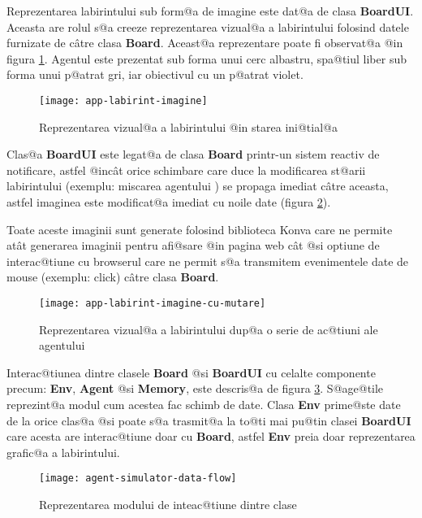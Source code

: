 Reprezentarea labirintului sub form@a de imagine este dat@a de clasa \textbf{BoardUI}. Aceasta are rolul s@a creeze reprezentarea vizual@a a labirintului folosind datele furnizate de c\^ atre clasa \textbf{Board}. Aceast@a reprezentare poate fi observat@a @in figura \ref{fig:labirint-imagine}. Agentul este prezentat sub forma unui cerc albastru, spa@tiul liber sub forma unui p@atrat gri, iar obiectivul cu un p@atrat violet.

\begin{figure}[h]
	\centering
	\texttt{[image: app-labirint-imagine]}
	\caption{Reprezentarea vizual@a a labirintului @in starea ini@tial@a}
	\label{fig:labirint-imagine}
\end{figure}

Clas@a \textbf{BoardUI} este legat@a de clasa \textbf{Board} printr-un sistem reactiv de notificare, astfel @inc\^ at orice schimbare care duce la modificarea st@arii labirintului (exemplu: miscarea agentului ) se propaga imediat c\^ atre aceasta, astfel imaginea este modificat@a imediat cu noile date (figura \ref{fig:labirint-imagine-cu-mutare}).

Toate aceste imaginii sunt generate folosind biblioteca Konva care ne permite at\^ at generarea imaginii pentru afi@sare @in pagina web c\^ at @si optiune de interac@tiune cu browserul care ne permit s@a transmitem evenimentele date de mouse (exemplu: click) c\^ atre clasa \textbf{Board}.

\begin{figure}[h]
	\centering
	\texttt{[image: app-labirint-imagine-cu-mutare]}
	\caption{Reprezentarea vizual@a a labirintului dup@a o serie de ac@tiuni ale agentului}
	\label{fig:labirint-imagine-cu-mutare}
\end{figure}

Interac@tiunea dintre clasele \textbf{Board} @si \textbf{BoardUI} cu celalte componente precum: \textbf{Env}, \textbf{Agent} @si \textbf{Memory}, este descris@a de figura \ref{fig:agent-simulator-data-flow}. S@age@tile reprezint@a modul cum acestea fac schimb de date. Clasa \textbf{Env} prime@ste date de la orice clas@a @si poate s@a trasmit@a la to@ti mai pu@tin clasei \textbf{BoardUI} care acesta are interac@tiune doar cu \textbf{Board}, astfel \textbf{Env} preia doar reprezentarea grafic@a a labirintului.

\begin{figure}[H]
	\centering
	\texttt{[image: agent-simulator-data-flow]}
	\caption{Reprezentarea modului de inteac@tiune dintre clase}
	\label{fig:agent-simulator-data-flow}
\end{figure}



